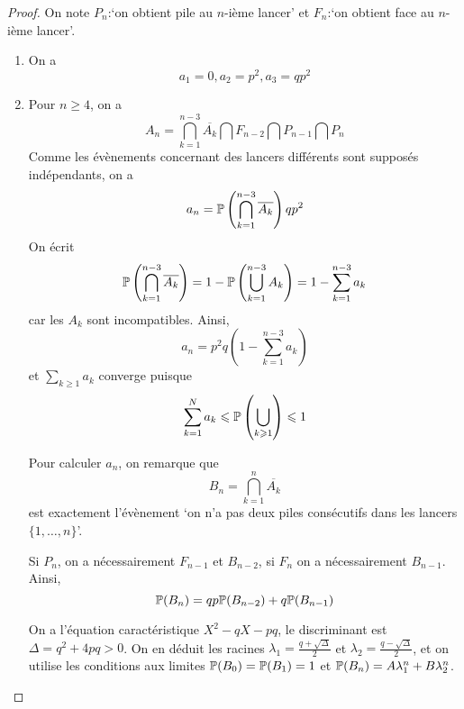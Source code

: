 \documentclass[12pt]{article}
\begin{document}
\begin{proof}
    On note $P_{n}$:`on obtient pile au $n$-ième lancer' et $F_{n}$:`on obtient face au $n$-ième lancer'.
    \begin{enumerate}
        \item On a 
        \begin{equation}
            \boxed{a_{1}=0,a_{2}=p^{2},a_{3}=qp^{2}}
        \end{equation}
        \item Pour $n\geqslant4$, on a 
        \begin{equation}
            A_{n}=\bigcap_{k=1}^{n-3}\overline{A_{k}}\bigcap F_{n-2}\bigcap P_{n-1}\bigcap P_{n}
        \end{equation}
        Comme les évènements concernant des lancers différents sont supposés indépendants, on a 
        \begin{equation}
            a_{n}=\P\left(\bigcap_{k=1}^{n-3}\overline{A_{k}}\right)qp^{2}
        \end{equation}
        On écrit 
        \begin{equation}
            \P\left(\bigcap_{k=1}^{n-3}\overline{A_{k}}\right)=1-\P\left(\bigcup_{k=1}^{n-3}A_{k}\right)=1-\sum_{k=1}^{n-3}a_{k}
        \end{equation}
        car les $A_{k}$ sont incompatibles. Ainsi, 
        \begin{equation}
            a_{n}=p^{2}q\left(1-\sum_{k=1}^{n-3}a_{k}\right)
        \end{equation}
        et $\sum_{k\geqslant1}a_{k}$ converge puisque 
        \begin{equation}
            \sum_{k=1}^{N}a_{k}\leqslant\P\left(\bigcup_{k\geqslant1}\right)\leqslant1
        \end{equation}

        Pour calculer $a_{n}$, on remarque que 
        \begin{equation}
            B_{n}=\bigcap_{k=1}^{n}\overline{A_{k}}
        \end{equation}
        est exactement l'évènement `on n'a pas deux piles consécutifs dans les lancers $\lbrace1,\dots,n\rbrace$'.

        Si $P_{n}$, on a nécessairement $F_{n-1}$ et $B_{n-2}$, si $F_{n}$ on a nécessairement $B_{n-1}$. Ainsi,
        \begin{equation}
            \P(B_{n})=qp\P(B_{n-2})+q\P(B_{n-1})
        \end{equation}

        On a l'équation caractéristique $X^{2}-qX-pq$, le discriminant est $\Delta=q^{2}+4pq>0$. On en déduit les racines $\lambda_{1}=\frac{q+\sqrt{\Delta}}{2}$ et $\lambda_{2}=\frac{q-\sqrt{\Delta}}{2}$, et on utilise les conditions aux limites $\P(B_{0})=\P(B_{1})=1$ et $\P(B_{n})=A\lambda_{1}^{n}+B\lambda_{2}^{n}$.
    \end{enumerate}
\end{proof}
\end{document}
